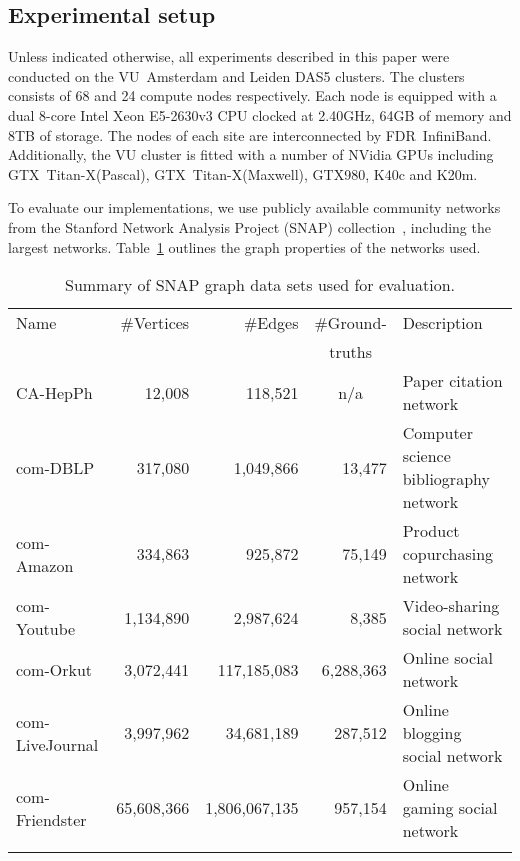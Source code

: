 \subsection{Experimental setup}
\label{sec-experimental}

Unless indicated otherwise, all experiments described in this paper
were conducted on the VU~Amsterdam and Leiden DAS5 clusters.  The clusters
consists of 68 and 24 compute nodes respectively. Each node is equipped with
a dual 8-core Intel Xeon E5-2630v3 CPU clocked at 2.40GHz, 64GB of memory and
8TB of storage. The nodes of each site are interconnected by FDR~InfiniBand.
Additionally, the VU cluster is fitted with a number of NVidia GPUs including
GTX~\mbox{Titan-X(Pascal)},
GTX~\mbox{Titan-X(Maxwell)}, GTX980, K40c and K20m.

To evaluate our implementations, we use publicly available
community networks from the Stanford Network Analysis Project (SNAP)
collection~\cite{snapnets}, including the largest networks.
Table~\ref{table-snap}
outlines the graph properties of the networks used.

\begin{table}
  \centering
  \def\tabcolsep{0.2em}
  \begin{tabular}{l r r r p{9em}}
    Name            & \#Vertices &       \#Edges & \multicolumn{1}{c}{\#Ground-} & Description \\
                    &            &               & \multicolumn{1}{c}{truths}    &             \\
    \hline
    CA-HepPh        &    12,008  &    118,521    & \multicolumn{1}{c}{n/a}       & Paper citation network \\
    com-DBLP        &    317,080 &     1,049,866 & 13,477         & Computer science bibliography network \\
    com-Amazon      &    334,863 &       925,872 & 75,149         & Product copurchasing network \\
    com-Youtube     &  1,134,890 &     2,987,624 & 8,385          & Video-sharing social network \\
    com-Orkut       &  3,072,441 &   117,185,083 & 6,288,363      & Online social network \\
    com-LiveJournal &  3,997,962 &    34,681,189 & 287,512        & Online blogging social network \\
    com-Friendster  & 65,608,366 & 1,806,067,135 & 957,154        & Online gaming social network \\
    \hline
    \\[-1ex]
  \end{tabular}
  \caption{Summary of SNAP graph data sets used for evaluation.}
  \label{table-snap}
\end{table}

